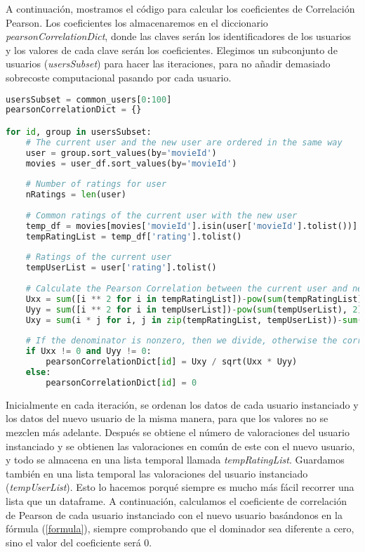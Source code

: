 \documentclass{uimppracticas}
\begin{document}
A continuación, mostramos el código para calcular los coeficientes de Correlación Pearson. Los coeficientes los almacenaremos en el diccionario \textit{pearsonCorrelationDict}, donde las claves serán los identificadores de los usuarios y los valores de cada clave serán los coeficientes. Elegimos un subconjunto de usuarios (\textit{usersSubset}) para hacer las iteraciones, para no añadir demasiado sobrecoste computacional pasando por cada usuario.

\begin{lstlisting}[language=python, basicstyle=\small]
usersSubset = common_users[0:100]	
pearsonCorrelationDict = {}

for id, group in usersSubset:
	# The current user and the new user are ordered in the same way
	user = group.sort_values(by='movieId')
	movies = user_df.sort_values(by='movieId')
	
	# Number of ratings for user
	nRatings = len(user)
	
	# Common ratings of the current user with the new user
	temp_df = movies[movies['movieId'].isin(user['movieId'].tolist())]
	tempRatingList = temp_df['rating'].tolist()
	
	# Ratings of the current user
	tempUserList = user['rating'].tolist()
	
	# Calculate the Pearson Correlation between the current user and new user
	Uxx = sum([i ** 2 for i in tempRatingList])-pow(sum(tempRatingList), 2) / float(nRatings)
	Uyy = sum([i ** 2 for i in tempUserList])-pow(sum(tempUserList), 2) / float(nRatings)
	Uxy = sum(i * j for i, j in zip(tempRatingList, tempUserList))-sum(tempRatingList) * sum(tempUserList) / float(nRatings)
	
	# If the denominator is nonzero, then we divide, otherwise the correlation is 0
	if Uxx != 0 and Uyy != 0:
		pearsonCorrelationDict[id] = Uxy / sqrt(Uxx * Uyy)
	else:
		pearsonCorrelationDict[id] = 0
\end{lstlisting}

Inicialmente en cada iteración, se ordenan los datos de cada usuario instanciado y los datos del nuevo usuario de la misma manera, para que los valores no se mezclen más adelante. Después se obtiene el número de valoraciones del usuario instanciado y se obtienen las valoraciones en común de este con el nuevo usuario, y todo se almacena en una lista temporal llamada \textit{tempRatingList}. Guardamos también en una lista temporal las valoraciones del usuario instanciado (\textit{tempUserList}). Esto lo hacemos porqué siempre es mucho más fácil recorrer una lista que un dataframe. A continuación, calculamos el coeficiente de correlación de Pearson de cada usuario instanciado con el nuevo usuario basándonos en la fórmula (\ref{formula}), siempre comprobando que el dominador sea diferente a cero, sino el valor del coeficiente será 0.
\end{document}
